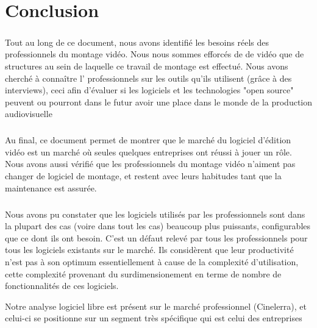 \newpage \chapter*{Conclusion}

\paragraph{}

Tout au long de ce document, nous avons identifié les besoins réels
des professionnels du montage vidéo. Nous nous sommes efforcés de
de vidéo que de structures au sein de laquelle ce travail de montage
est effectué. Nous avons  cherché à connaître l'%
professionnels sur les outils qu'ils utilisent (grâce à des interviews),
ceci afin d'évaluer si les logiciels et les technologies "open source"
peuvent ou pourront dans le futur avoir une place dans le monde de la
production audiovisuelle %

\paragraph{}

Au final, ce document permet de montrer que le marché du logiciel
d'édition vidéo est un marché où seules quelques entreprises
ont réussi à jouer un rôle. Nous avons aussi vérifié que les
professionnels du montage vidéo n'aiment pas changer de logiciel de
montage, et restent avec leurs habitudes tant que la maintenance est
assurée.

\paragraph{}

Nous avons pu constater que les logiciels utilisés par les professionnels
sont dans la plupart des cas (voire dans tout les cas) beaucoup plus
puissants, configurables que ce dont ils ont besoin. C'est un défaut
relevé par tous les professionnels pour tous les logiciels existants
sur le marché. Ils considèrent que leur productivité n'est pas à
son optimum essentiellement à cause de la complexité d'utilisation,
cette complexité provenant du surdimensionement en terme de nombre de
fonctionnalités de ces logiciels.

Notre analyse %
logiciel libre est présent sur le marché professionnel (Cinelerra),
et celui-ci se positionne sur un segment très spécifique qui est celui
des entreprises%

